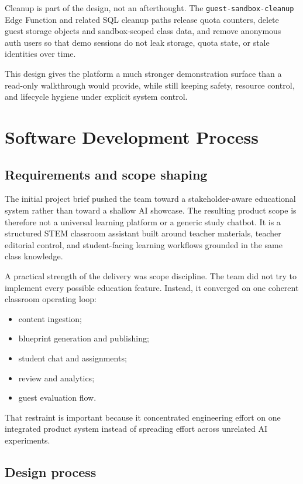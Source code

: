 \documentclass[11pt,a4paper]{article}
\begin{document}
Cleanup is part of the design, not an afterthought. The
\texttt{guest-sandbox-cleanup} Edge Function and related SQL cleanup paths release quota counters,
delete guest storage objects and sandbox-scoped class data, and remove anonymous auth users so that
demo sessions do not leak storage, quota state, or stale identities over time.

This design gives the platform a much stronger demonstration surface than a read-only walkthrough
would provide, while still keeping safety, resource control, and lifecycle hygiene under explicit
system control.

\section{Software Development Process}

\subsection{Requirements and scope shaping}

The initial project brief pushed the team toward a stakeholder-aware educational system rather than
toward a shallow AI showcase. The resulting product scope is therefore not a universal learning
platform or a generic study chatbot. It is a structured STEM classroom assistant built around
teacher materials, teacher editorial control, and student-facing learning workflows grounded in the
same class knowledge.

A practical strength of the delivery was scope discipline. The team did not try to implement every
possible education feature. Instead, it converged on one coherent classroom operating loop:
\begin{itemize}
  \item content ingestion;
  \item blueprint generation and publishing;
  \item student chat and assignments;
  \item review and analytics;
  \item guest evaluation flow.
\end{itemize}

That restraint is important because it concentrated engineering effort on one integrated product
system instead of spreading effort across unrelated AI experiments.

\subsection{Design process}
\end{document}
